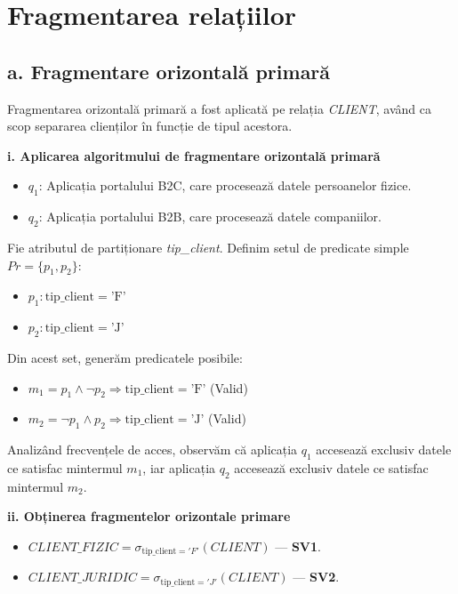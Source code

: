 \chapter{Fragmentarea relațiilor}

\section*{a. Fragmentare orizontală primară}

Fragmentarea orizontală primară a fost aplicată pe relația \textit{CLIENT}, având ca scop separarea clienților în funcție de tipul acestora.

\textbf{i. Aplicarea algoritmului de fragmentare orizontală primară}\\
\begin{itemize}
    \item $q_1$: Aplicația portalului B2C, care procesează datele persoanelor fizice.
    \item $q_2$: Aplicația portalului B2B, care procesează datele companiilor.
\end{itemize}

Fie atributul de partiționare \textit{tip\_client}. Definim setul de predicate simple $Pr = \{p_1, p_2\}$:
\begin{itemize}
    \item $p_1 : \text{tip\_client} = \text{'F'}$
    \item $p_2 : \text{tip\_client} = \text{'J'}$
\end{itemize}

Din acest set, generăm predicatele posibile:
\begin{itemize}
    \item $m_1 = p_1 \wedge \neg p_2 \Rightarrow \text{tip\_client} = \text{'F'}$ (Valid)
    \item $m_2 = \neg p_1 \wedge p_2 \Rightarrow \text{tip\_client} = \text{'J'}$ (Valid)
\end{itemize}

Analizând frecvențele de acces, observăm că aplicația $q_1$ accesează exclusiv datele ce satisfac mintermul $m_1$, iar aplicația $q_2$ accesează exclusiv datele ce satisfac mintermul $m_2$.

\textbf{ii. Obținerea fragmentelor orizontale primare}\\
\begin{itemize}
    \item $CLIENT\_FIZIC = \sigma_{\text{tip\_client}='F'}(CLIENT)$ --- \textbf{SV1}.
    \item $CLIENT\_JURIDIC = \sigma_{\text{tip\_client}='J'}(CLIENT)$ --- \textbf{SV2}.
\end{itemize}

